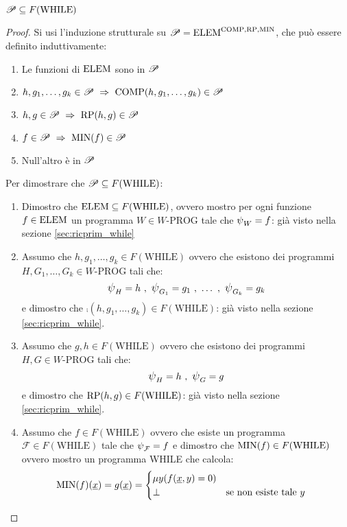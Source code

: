 \begin{theorem}\label{th:ricParWhile}
    $\mathscr{P} \subseteq F(\text{WHILE})$
\end{theorem}
\begin{proof}
    Si usi l'induzione strutturale su $\mathscr{P}=\text{ELEM}^{\text{COMP},\text{RP},\text{MIN}}$, che può essere definito
    induttivamente:
    \begin{enumerate}
        \item Le funzioni di $\text{ELEM}$ sono in $\mathscr{P}$
        \item $h,g_1,\dots,g_k\in\ricPar\ \Rightarrow\ \comp(h,g_1,\dots,g_k)\in\ricPar$
        \item $h,g\in\ricPar\ \Rightarrow\ \RP(h,g)\in\ricPar$
        \item $f\in\ricPar\ \Rightarrow\ \MIN(f)\in\ricPar$
        \item Null'altro è in $\mathscr{P}$
    \end{enumerate}
    Per dimostrare che $\mathscr{P} \subseteq F(\text{WHILE})$:
    \begin{enumerate}
    \item Dimostro che $\text{ELEM}\subseteq F(\text{WHILE})$, ovvero mostro per ogni funzione 
    $f\in\text{ELEM}$ un programma $W\in W\text{-PROG}$ tale che $\semWHILE_W=f$: già visto
    nella sezione \ref{sec:ricprim_while}
    \item Assumo che $h,g_1,\dots,g_k\in F(\text{WHILE})$ ovvero che esistono dei programmi
        $H,G_1,\dots,G_k\in W\text{-PROG}$ tali che:
        $$ \semWHILE_H=h \ ,\ \semWHILE_{G_1}=g_1\ ,\ \dots \ ,\
        \semWHILE_{G_k}=g_k $$
        e dimostro che $\comp(h,g_1,\dots,g_k)\in F(\text{WHILE})$: già visto nella sezione
        \ref{sec:ricprim_while}.
    \begin{minipage}{.9\textwidth}
        \begin{algorithm}[H]

        \end{algorithm}
    \end{minipage}
    \item Assumo che $g,h\in F(\text{WHILE})$ ovvero che esistono dei programmi
        $H,G\in W\text{-PROG}$ tali che:
        $$ \semWHILE_H=h \ ,\ \semWHILE_{G}=g $$ 
        e dimostro che 
        $\text{RP}(h,g)\in F(\text{WHILE})$: già visto nella sezione \ref{sec:ricprim_while}.
    \item Assumo che $f\in F(\text{WHILE})$ ovvero che esiste un programma $\mathcal{F}\in
        F(\text{WHILE})$ tale che $\semWHILE_\mathcal{F}=f$
        e dimostro che $\text{MIN}(f)\in F(\text{WHILE})$ ovvero mostro un programma WHILE
        che calcola:
        $$ \begin{aligned}
            \text{MIN}(f)(\text{\underline{$x$}}) = g(\text{\underline{$x$}}) &=
            \begin{cases}
                \mu y(f(\text{\underline{$x$}},y)=0)\\
                \perp & \text{se non esiste tale $y$}
            \end{cases}
        \end{aligned}$$
        \vspace{.7em}


\end{enumerate}
\end{proof}
